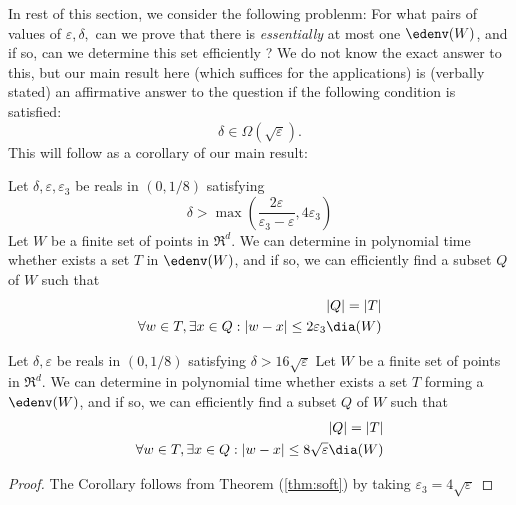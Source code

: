 In rest of this section, we consider the following problenm: For what pairs of values of $\varepsilon,\delta,$ can we prove that there is {\em essentially} at most one $\edenv(W)$, and if so, can we determine this set efficiently ? 
We do not know the exact answer to this, but our main result here (which suffices for the applications) is 
(verbally stated) an affirmative answer to the question if the following condition is satisfied:
$$\delta\in \Omega(\sqrt\varepsilon).$$
This will follow as a corollary of our main result:

\begin{theorem}
\label{thm:soft}
Let
$\delta,\varepsilon,\varepsilon_3$ be reals in $(0,1/8)$ satisfying
\begin{equation}
\label{822}\delta> \max \left(\frac{2\varepsilon}{\varepsilon_3-\varepsilon}, 4 \varepsilon_3 \right)
\end{equation}
Let $W$ be a finite set of points in $\Re^d$. 
We can 
determine in polynomial time whether  exists a set $T$ in $\edenv(W)$, and if so,  we can efficiently 
find a subset $Q$ of $W$ such that
\begin{align}
|Q|=|T|\\
\forall w\in T, \exists x\in Q: |w-x|\leq 2\varepsilon_3 \dia(W)
\end{align}
\end{theorem}
\begin{corollary}\label{cor:soft}
Let
$\delta,\varepsilon$ be reals in $(0,1/8)$ satisfying $\delta>16\sqrt\varepsilon$
Let $W$ be a finite set of points in $\Re^d$. 
We can 
determine in polynomial time whether  exists a set $T$ forming a $\edenv(W)$, and if so,  we can efficiently 
find a subset $Q$ of $W$ such that
\begin{align}
|Q|=|T|\\
\forall w\in T, \exists x\in Q: |w-x|\leq 8\sqrt \varepsilon \dia(W)
\end{align} 
\end{corollary}
\begin{proof}
The Corollary follows from Theorem (\ref{thm:soft}) by taking $\varepsilon_3=4\sqrt\varepsilon$ 
\end{proof}
